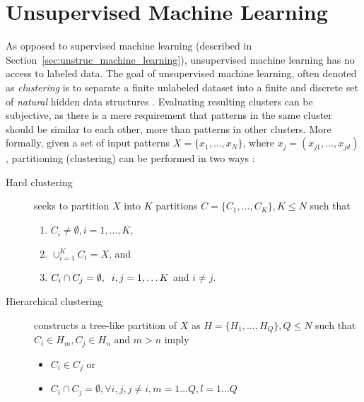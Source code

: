 \section{Unsupervised Machine Learning}
\label{sec:unsupervised_machine_learning}

As opposed to supervised machine learning (described in
Section~\ref{sec:unstruc_machine_learning}), unsupervised machine learning
has no access to labeled data. The goal of unsupervised machine learning,
often denoted as \textit{clustering} is to separate 
a finite unlabeled dataset into a finite and discrete set of 
\textit{natural} hidden data structures \citep{xu2005survey}.
Evaluating resulting clusters can be subjective, as there is a mere 
requirement that patterns in the same cluster should be similar to each
other, more than patterns in other clusters. More formally, 
given a set of input patterns $X = \{x_1, \dots, x_N\}$, where
$x_j = (x_{j1}, \dots, x_{jd})$, partitioning (clustering) can 
be performed in two ways \citep{xu2005survey}:
\begin{description}
\item[Hard clustering] seeks to partition $X$ into $K$ partitions $C=\{C_1,
	\dots, C_K\}, K \leq N$ such that 
	\begin{enumerate}
	\item $C_i \neq \emptyset, i = 1, \dots, K$, 
	\item $\cup_{i=1}^{K} C_i = X$, and
	\item $C_i \cap C_j = \emptyset, \hspace{0.2cm}i, j = 1, \dots K$ and $i \neq j$.
	\end{enumerate}
\item[Hierarchical clustering] constructs a tree-like partition of $X$ as 
	$H = \{H_1, \dots, H_Q\}, Q \leq N$ such that
	$C_i \in H_m, C_j \in H_n$ and $m > n$
	imply 
	\begin{itemize}
	\item $C_i \in C_j$ or 
	\item $C_i \cap C_j = \emptyset, \forall i, j, j \neq
		i, m = 1 \dots Q, l = 1 \dots Q$
	\end{itemize}
\end{description}

